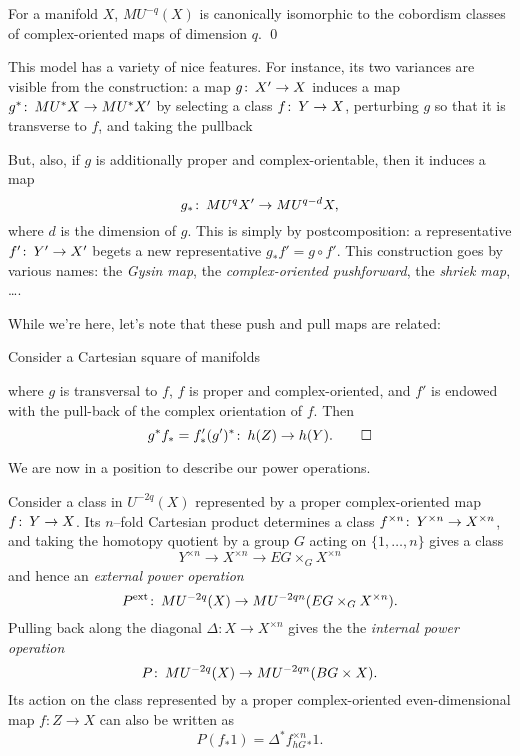 \begin{theorem}[Thom]
For a manifold $X$, $MU^{-q}(X)$ is canonically isomorphic to the cobordism classes of complex-oriented maps of dimension $q$. \qed
\end{theorem}

\begin{remark}
This model has a variety of nice features.  For instance, its two variances are visible from the construction: a map $g\colon\thinspace X' \to X$ induces a map $g^*\colon\thinspace MU^* X \to MU^* X'$ by selecting a class $f\colon\thinspace Y \to X$, perturbing $g$ so that it is transverse to $f$, and taking the pullback
\begin{center}
\end{center}
But, also, if $g$ is additionally proper and complex-orientable, then it induces a map \[g_*\colon\thinspace MU^q X' \to MU^{q-d} X,\] where $d$ is the dimension of $g$.  This is simply by postcomposition: a representative $f'\colon\thinspace Y' \to X'$ begets a new representative $g_* f' = g \circ f'$.  This construction goes by various names: the \textit{Gysin map}, the \textit{complex-oriented pushforward}, the \textit{shriek map}, \ldots.
\end{remark}

While we're here, let's note that these push and pull maps are related:
\begin{lemma}\label{PushPullFormulaForMU}
Consider a Cartesian square of manifolds
\begin{center}
\end{center}
where $g$ is transversal to $f$, $f$ is proper and complex-oriented, and $f'$ is endowed with the pull-back of the complex orientation of $f$. Then \[g^* f_* = f'_* (g')^*\colon\thinspace h(Z) \to h(Y). \qed\]
\end{lemma}


We are now in a position to describe our power operations.
\begin{definition}\label{DefnPowerOperationForMU}
Consider a class in $U^{-2q}(X)$ represented by a proper complex-oriented map $f \colon\thinspace Y \to X$.  Its $n$--fold Cartesian product determines a class $f^{\times n} \colon\thinspace Y^{\times n} \to X^{\times n}$, and taking the homotopy quotient by a group $G$ acting on $\{1, \ldots, n\}$ gives a class \[Y^{\times n} \to X^{\times n} \to EG \times_G X^{\times n}\] and hence an \textit{external power operation} \[P^{\mathrm{ext}} \colon\thinspace MU^{-2q}(X) \to MU^{-2qn}(EG \times_G X^{\times n}).\]  Pulling back along the diagonal $\Delta: X \to X^{\times n}$ gives the the \textit{internal power operation} \[P \colon\thinspace MU^{-2q}(X) \to MU^{-2qn}(BG \times X).\]  Its action on the class represented by a proper complex-oriented even-dimensional map $f: Z \to X$ can also be written as \[P(f_* 1) = \Delta^* f^{\times n}_{hG}{}_* 1.\]
\end{definition}

